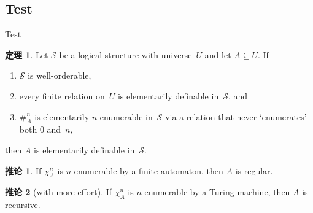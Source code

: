 \documentclass[12pt,hyperref={bookmarks=false},notheorems]{beamer}
\theoremstyle{definition}
\newtheorem{theorem}{\CJKfamily{hei} 定理}
\newtheorem{corollary}{\CJKfamily{hei} 推论}
\begin{document}
\subsection{Test}
\begin{frame}{Test}

  \begin{theorem}
    Let $\mathcal S$ be a logical structure with universe~$U$ and let
    $A \subseteq U$. If

    \begin{enumerate}
    \item
      $\mathcal S$ is well-orderable,
    \item
      every finite relation on~$U$ is elementarily definable
      in~$\mathcal S$, and
    \item
      \alert{$\#_{\!A}^n$} is elementarily \alert{$n$}-enumerable in~$\mathcal S$ via a
      relation that \alert{never `enumerates' both $0$ and~$n$},
    \end{enumerate}

    then \alert{$A$ is elementarily definable} in~$\mathcal S$.
  \end{theorem}
    \begin{overprint}
      \begin{corollary}
        If $\chi_A^n$ is $n$-enumerable by a finite automaton, then
        $A$ is regular.
      \end{corollary}

      \begin{corollary}[with more effort]
        If $\chi_A^n$ is $n$-enumerable by a Turing machine, then $A$
        is recursive.
      \end{corollary}
  \end{overprint}
\end{frame}
\end{document}
